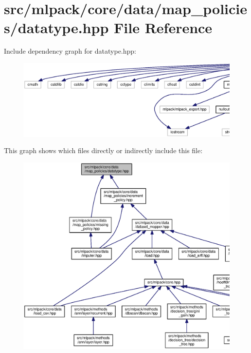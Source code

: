 \section{src/mlpack/core/data/map\+\_\+policies/datatype.hpp File Reference}
\label{datatype_8hpp}
Include dependency graph for datatype.\+hpp\+:
\nopagebreak
\begin{figure}[H]
\begin{center}
\leavevmode
\includegraphics[width=350pt]{datatype_8hpp__incl}
\end{center}
\end{figure}
This graph shows which files directly or indirectly include this file\+:
\nopagebreak
\begin{figure}[H]
\begin{center}
\leavevmode
\includegraphics[width=350pt]{datatype_8hpp__dep__incl}
\end{center}
\end{figure}
